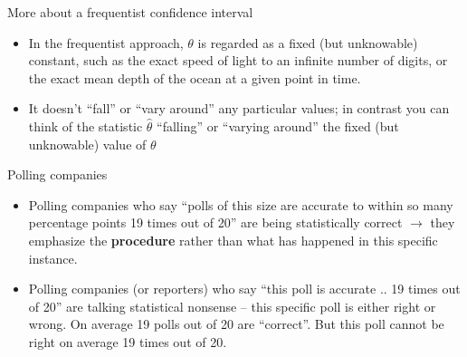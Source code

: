 \documentclass[10pt]{beamer}\usepackage[]{graphicx}\usepackage[]{color}
\begin{document}
\begin{frame}{More about a frequentist confidence interval}
	\begin{itemize}
		\setlength\itemsep{2em}
		\item In the frequentist approach, $\theta$ is regarded as a fixed (but unknowable) constant, such as the exact speed of light to an infinite number of digits, or the exact mean depth of the ocean at a given point in time. \pause
		
		\item It doesn't ``fall'' or ``vary around'' any particular values; in contrast you can think of the statistic $\hat{\theta}$ ``falling'' or ``varying around'' the fixed (but unknowable) value of $\theta$
	\end{itemize}
\end{frame}


\begin{frame}{Polling companies}
	\begin{itemize}
		\setlength\itemsep{2em}
		\item Polling companies who say ``polls of this size are accurate to within so many percentage points 19 times out of 20'' are being statistically correct $\to$ they emphasize the \textbf{procedure} rather than what has happened in this specific instance. \pause 
		\item Polling companies (or reporters) who say ``this poll is accurate .. 19
		times out of 20'' are talking statistical nonsense -- this specific poll is either right or wrong. On average 19 polls out of 20 are ``correct''. But this
		poll cannot be right on average 19 times out of 20.
	\end{itemize}
\end{frame}

\end{document}
